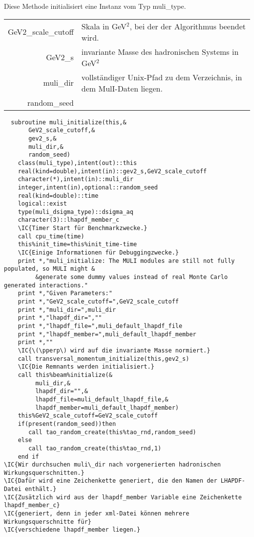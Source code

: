 Diese Methode initialisiert eine Instanz vom Typ muli\_type.

\begin{tabular}{rl}
  GeV2\_scale\_cutoff&Skala in GeV$^2$, bei der der Algorithmus beendet wird.\\
  GeV2\_s&invariante Masse des hadronischen Systems in GeV$^2$\\
  muli\_dir&vollständiger Unix-Pfad zu dem Verzeichnis, in dem MulI-Daten liegen.\\
  random\_seed&
\end{tabular}

\begin{Verbatim}
  subroutine muli_initialize(this,&
       GeV2_scale_cutoff,&
       gev2_s,&              
       muli_dir,&
       random_seed)
    class(muli_type),intent(out)::this
    real(kind=double),intent(in)::gev2_s,GeV2_scale_cutoff
    character(*),intent(in)::muli_dir
    integer,intent(in),optional::random_seed
    real(kind=double)::time
    logical::exist
    type(muli_dsigma_type)::dsigma_aq
    character(3)::lhapdf_member_c
    \IC{Timer Start für Benchmarkzwecke.}
    call cpu_time(time)
    this%init_time=this%init_time-time
    \IC{Einige Informationen für Debuggingzwecke.}
    print *,"muli_initialize: The MULI modules are still not fully populated, so MULI might &
         &generate some dummy values instead of real Monte Carlo generated interactions."
    print *,"Given Parameters:"
    print *,"GeV2_scale_cutoff=",GeV2_scale_cutoff
    print *,"muli_dir=",muli_dir
    print *,"lhapdf_dir=",""
    print *,"lhapdf_file=",muli_default_lhapdf_file
    print *,"lhapdf_member=",muli_default_lhapdf_member
    print *,""
    \IC{\(\pperp\) wird auf die invariante Masse normiert.}
    call transversal_momentum_initialize(this,gev2_s)
    \IC{Die Remnants werden initialisiert.}
    call this%beam%initialize(&
         muli_dir,&
         lhapdf_dir="",&
         lhapdf_file=muli_default_lhapdf_file,&
         lhapdf_member=muli_default_lhapdf_member)
    this%GeV2_scale_cutoff=GeV2_scale_cutoff
    if(present(random_seed))then
       call tao_random_create(this%tao_rnd,random_seed)
    else
       call tao_random_create(this%tao_rnd,1)
    end if
\IC{Wir durchsuchen muli\_dir nach vorgenerierten hadronischen Wirkungsquerschnitten.}
\IC{Dafür wird eine Zeichenkette generiert, die den Namen der LHAPDF-Datei enthält.}
\IC{Zusätzlich wird aus der lhapdf_member Variable eine Zeichenkette lhapdf_member_c}
\IC{generiert, denn in jeder xml-Datei können mehrere Wirkungsquerschnitte für}
\IC{verschiedene lhapdf_member liegen.}
\end{Verbatim}

